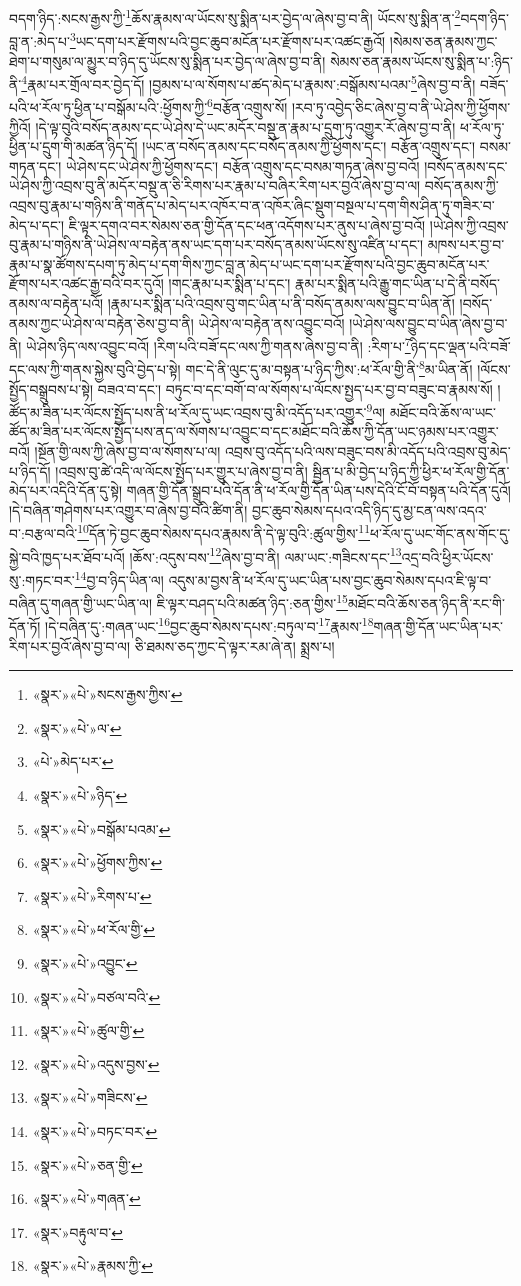 བདག་ཉིད་:སངས་རྒྱས་ཀྱི་\footnote{«སྣར་»«པེ་»སངས་རྒྱས་ཀྱིས་}ཆོས་རྣམས་ལ་ཡོངས་སུ་སྨིན་པར་བྱེད་ལ་ཞེས་བྱ་བ་ནི། ཡོངས་སུ་སྨིན་ན་\footnote{«སྣར་»«པེ་»ལ་}བདག་ཉིད་བླ་ན་:མེད་པ་\footnote{«པེ་»མེད་པར་}ཡང་དག་པར་རྫོགས་པའི་བྱང་ཆུབ་མངོན་པར་རྫོགས་པར་འཚང་རྒྱའོ། །སེམས་ཅན་རྣམས་ཀྱང་ཐེག་པ་གསུམ་ལ་མྱུར་བ་ཉིད་དུ་ཡོངས་སུ་སྨིན་པར་བྱེད་ལ་ཞེས་བྱ་བ་ནི། སེམས་ཅན་རྣམས་ཡོངས་སུ་སྨིན་པ་:ཉིད་ནི་\footnote{«སྣར་»«པེ་»ཉིད་}རྣམ་པར་གྲོལ་བར་བྱེད་དོ། །བྱམས་པ་ལ་སོགས་པ་ཚད་མེད་པ་རྣམས་:བསྒོམས་པའམ་\footnote{«སྣར་»«པེ་»བསྒོམ་པའམ་}ཞེས་བྱ་བ་ནི། བཟོད་པའི་ཕ་རོལ་ཏུ་ཕྱིན་པ་བསྒོམ་པའི་:ཕྱོགས་ཀྱི་\footnote{«སྣར་»«པེ་»ཕྱོགས་ཀྱིས་}བརྩོན་འགྲུས་སོ། །རབ་ཏུ་འབྱེད་ཅིང་ཞེས་བྱ་བ་ནི་ཡེ་ཤེས་ཀྱི་ཕྱོགས་ཀྱིའོ། །དེ་ལྟ་བུའི་བསོད་ནམས་དང་ཡེ་ཤེས་དེ་ཡང་མདོར་བསྡུ་ན་རྣམ་པ་དྲུག་ཏུ་འགྱུར་རོ་ཞེས་བྱ་བ་ནི། ཕ་རོལ་ཏུ་ཕྱིན་པ་དྲུག་གི་མཚན་ཉིད་དོ། །ཡང་ན་བསོད་ནམས་དང་བསོད་ནམས་ཀྱི་ཕྱོགས་དང་། བརྩོན་འགྲུས་དང་། བསམ་གཏན་དང་། ཡེ་ཤེས་དང་ཡེ་ཤེས་ཀྱི་ཕྱོགས་དང་། བརྩོན་འགྲུས་དང་བསམ་གཏན་ཞེས་བྱ་བའོ། །བསོད་ནམས་དང་ཡེ་ཤེས་ཀྱི་འབྲས་བུ་ནི་མདོར་བསྡུ་ན་ཅི་རིགས་པར་རྣམ་པ་བཞིར་རིག་པར་བྱའོ་ཞེས་བྱ་བ་ལ། བསོད་ནམས་ཀྱི་འབྲས་བུ་རྣམ་པ་གཉིས་ནི་གནོད་པ་མེད་པར་འཁོར་བ་ན་འཁོར་ཞིང་སྡུག་བསྔལ་པ་དག་གིས་ཤིན་ཏུ་གཟིར་བ་མེད་པ་དང་། ཇི་ལྟར་དགའ་བར་སེམས་ཅན་གྱི་དོན་དང་ཕན་འདོགས་པར་ནུས་པ་ཞེས་བྱ་བའོ། །ཡེ་ཤེས་ཀྱི་འབྲས་བུ་རྣམ་པ་གཉིས་ནི་ཡེ་ཤེས་ལ་བརྟེན་ནས་ཡང་དག་པར་བསོད་ནམས་ཡོངས་སུ་འཛིན་པ་དང་། མཁས་པར་བྱ་བ་རྣམ་པ་སྣ་ཚོགས་དཔག་ཏུ་མེད་པ་དག་གིས་ཀྱང་བླ་ན་མེད་པ་ཡང་དག་པར་རྫོགས་པའི་བྱང་ཆུབ་མངོན་པར་རྫོགས་པར་འཚང་རྒྱ་བའི་བར་དུའོ། །གང་རྣམ་པར་སྨིན་པ་དང་། རྣམ་པར་སྨིན་པའི་རྒྱུ་གང་ཡིན་པ་དེ་ནི་བསོད་ནམས་ལ་བརྟེན་པའོ། །རྣམ་པར་སྨིན་པའི་འབྲས་བུ་གང་ཡིན་པ་ནི་བསོད་ནམས་ལས་བྱུང་བ་ཡིན་ནོ། །བསོད་ནམས་ཀྱང་ཡེ་ཤེས་ལ་བརྟེན་ཅེས་བྱ་བ་ནི། ཡེ་ཤེས་ལ་བརྟེན་ནས་འབྱུང་བའོ། །ཡེ་ཤེས་ལས་བྱུང་བ་ཡིན་ཞེས་བྱ་བ་ནི། ཡེ་ཤེས་ཉིད་ལས་འབྱུང་བའོ། །རིག་པའི་བཟོ་དང་ལས་ཀྱི་གནས་ཞེས་བྱ་བ་ནི། :རིག་པ་\footnote{«སྣར་»«པེ་»རིགས་པ་}ཉིད་དང་ལྡན་པའི་བཟོ་དང་ལས་ཀྱི་གནས་སྐྱེས་བུའི་བྱེད་པ་སྟེ། གང་དེ་ནི་ལུང་དུ་མ་བསྟན་པ་ཉིད་ཀྱིས་:ཕ་རོལ་གྱི་ནི་\footnote{«སྣར་»«པེ་»ཕ་རོལ་གྱི་}མ་ཡིན་ནོ། །ལོངས་སྤྱོད་བསྒྲུབས་པ་སྟེ། བཟའ་བ་དང་། བཏུང་བ་དང་བགོ་བ་ལ་སོགས་པ་ལོངས་སྤྱད་པར་བྱ་བ་བཟུང་བ་རྣམས་སོ། །ཚོད་མ་ཟིན་པར་ལོངས་སྤྱོད་པས་ནི་ཕ་རོལ་དུ་ཡང་འབྲས་བུ་མི་འདོད་པར་འགྱུར་\footnote{«སྣར་»«པེ་»འབྱུང་}ལ། མཐོང་བའི་ཆོས་ལ་ཡང་ཚོད་མ་ཟིན་པར་ལོངས་སྤྱོད་པས་ནད་ལ་སོགས་པ་འབྱུང་བ་དང་མཐོང་བའི་ཆོས་ཀྱི་དོན་ཡང་ཉམས་པར་འགྱུར་བའོ། །སྔོན་གྱི་ལས་ཀྱི་ཞེས་བྱ་བ་ལ་སོགས་པ་ལ། འབྲས་བུ་འདོད་པའི་ལས་བཟུང་བས་མི་འདོད་པའི་འབྲས་བུ་མེད་པ་ཉིད་དོ། །འབྲས་བུ་ཚེ་འདི་ལ་ལོངས་སྤྱོད་པར་གྱུར་པ་ཞེས་བྱ་བ་ནི། སྦྱིན་པ་མི་བྱེད་པ་ཉིད་ཀྱི་ཕྱིར་ཕ་རོལ་གྱི་དོན་མེད་པར་འདིའི་དོན་དུ་སྟེ། གཞན་གྱི་དོན་སྒྲུབ་པའི་དོན་ནི་ཕ་རོལ་གྱི་དོན་ཡིན་པས་དེའི་ངོ་བོ་བསྟན་པའི་དོན་དུའོ། །དེ་བཞིན་གཤེགས་པར་འགྱུར་བ་ཞེས་བྱ་བའི་ཚིག་ནི། བྱང་ཆུབ་སེམས་དཔའ་འདི་ཉིད་དུ་མྱ་ངན་ལས་འདའ་བ་:བརྩལ་བའི་\footnote{«སྣར་»«པེ་»བཙལ་བའི་}དོན་ཏེ་བྱང་ཆུབ་སེམས་དཔའ་རྣམས་ནི་དེ་ལྟ་བུའི་:ཚུལ་གྱིས་\footnote{«སྣར་»«པེ་»ཚུལ་གྱི་}ཕ་རོལ་དུ་ཡང་གོང་ནས་གོང་དུ་སྐྱེ་བའི་ཁྱད་པར་ཐོབ་པའོ། །ཆོས་:འདུས་བས་\footnote{«སྣར་»«པེ་»འདུས་བྱས་}ཞེས་བྱ་བ་ནི། ལམ་ཡང་:གཟིངས་དང་\footnote{«སྣར་»«པེ་»གཟིངས་}འདྲ་བའི་ཕྱིར་ཡོངས་སུ་:གཏང་བར་\footnote{«སྣར་»«པེ་»བཏང་བར་}བྱ་བ་ཉིད་ཡིན་ལ། འདུས་མ་བྱས་ནི་ཕ་རོལ་དུ་ཡང་ཡིན་པས་བྱང་ཆུབ་སེམས་དཔའ་ཇི་ལྟ་བ་བཞིན་དུ་གཞན་གྱི་ཡང་ཡིན་ལ། ཇི་ལྟར་བཤད་པའི་མཚན་ཉིད་:ཅན་གྱིས་\footnote{«སྣར་»«པེ་»ཅན་གྱི་}མཐོང་བའི་ཆོས་ཅན་ཉིད་ནི་རང་གི་དོན་ཏོ། །དེ་བཞིན་དུ་:གཞན་ཡང་\footnote{«སྣར་»«པེ་»གཞན་}བྱང་ཆུབ་སེམས་དཔས་:བཏུལ་བ་\footnote{«སྣར་»བརྟུལ་བ་}རྣམས་\footnote{«སྣར་»«པེ་»རྣམས་ཀྱི་}གཞན་གྱི་དོན་ཡང་ཡིན་པར་རིག་པར་བྱའོ་ཞེས་བྱ་བ་ལ། ཅི་ཐམས་ཅད་ཀྱང་དེ་ལྟར་རམ་ཞེ་ན། སྨྲས་པ། 
